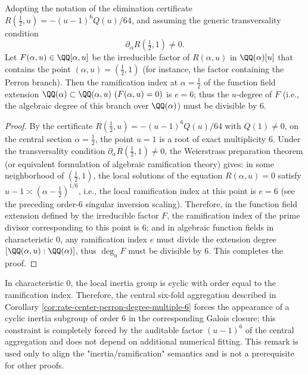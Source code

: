 \begin{corollary}\label{cor:rate-center-perron-degree-multiple-6}
Adopting the notation of the elimination certificate \(R(\tfrac12,u)=-(u-1)^6Q(u)/64\), and assuming the generic transversality condition
\[
\partial_\alpha R\!\left(\tfrac12,1\right)\neq 0.
\]
Let \(F(\alpha,u)\in\QQ[\alpha,u]\) be the irreducible factor of \(R(\alpha,u)\) in \(\QQ(\alpha)[u]\) that contains the point \((\alpha,u)=(\tfrac12,1)\) (for instance, the factor containing the Perron branch).
Then the ramification index at \(\alpha=\tfrac12\) of the function field extension
\(
\QQ(\alpha)\subset \QQ(\alpha,u)\ (F(\alpha,u)=0)
\)
is \(e=6\);
thus the \(u\)-degree of \(F\) (i.e., the algebraic degree of this branch over \(\QQ(\alpha)\)) must be divisible by \(6\).
\end{corollary}
\begin{proof}
By the certificate \(R(\tfrac12,u)=-(u-1)^6Q(u)/64\) with \(Q(1)\neq 0\), on the central section \(\alpha=\tfrac12\), the point \(u=1\) is a root of exact multiplicity \(6\).
Under the transversality condition \(\partial_\alpha R(\tfrac12,1)\neq 0\), the Weierstrass preparation theorem (or equivalent formulation of algebraic ramification theory) gives: in some neighborhood of \((\tfrac12,1)\), the local solutions of the equation \(R(\alpha,u)=0\) satisfy
\(
u-1\asymp (\alpha-\tfrac12)^{1/6}
\),
i.e., the local ramification index at this point is \(e=6\) (see the preceding order-\(6\) singular inversion scaling).
Therefore, in the function field extension defined by the irreducible factor \(F\), the ramification index of the prime divisor corresponding to this point is \(6\);
and in algebraic function fields in characteristic \(0\), any ramification index \(e\) must divide the extension degree \([\QQ(\alpha,u):\QQ(\alpha)]\), thus \(\deg_u F\) must be divisible by \(6\). This completes the proof.
\end{proof}

\begin{remark}\label{rem:rate-center-inertia-c6}
In characteristic \(0\), the local inertia group is cyclic with order equal to the ramification index.
Therefore, the central six-fold aggregation described in Corollary \ref{cor:rate-center-perron-degree-multiple-6} forces the appearance of a cyclic inertia subgroup of order \(6\) in the corresponding Galois closure;
this constraint is completely forced by the auditable factor \((u-1)^6\) of the central aggregation and does not depend on additional numerical fitting.
This remark is used only to align the "inertia/ramification" semantics and is not a prerequisite for other proofs.
\end{remark}
